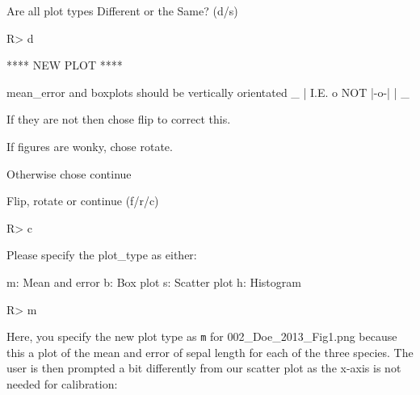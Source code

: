 \documentclass[12pt]{article}
\newcommand{\code}[1]{\texttt{#1}}
\begin{document}
\begin{CodeChunk}
\begin{CodeOutput}
Are all plot types Different or the Same? (d/s)
\end{CodeOutput}
\begin{CodeInput}
R> d
\end{CodeInput}
\begin{CodeOutput}
**** NEW PLOT ****

mean_error and boxplots should be vertically orientated
       _ 
       |  
  I.E. o    NOT  |-o-|
       |
       _

If they are not then chose flip to correct this.

If figures are wonky, chose rotate.

Otherwise chose continue

Flip, rotate or continue (f/r/c) 
\end{CodeOutput}
\begin{CodeInput}
R> c
\end{CodeInput}
\begin{CodeOutput}
Please specify the plot_type as either:

 m: Mean and error
 b: Box plot
 s: Scatter plot 
 h: Histogram
\end{CodeOutput}
\begin{CodeInput}
R> m
\end{CodeInput}
\end{CodeChunk}

Here, you specify the new plot type as \code{m} for 002\_Doe\_2013\_Fig1.png because this a plot of the mean and error of sepal length for each of the three species. The user is then prompted a bit differently from our scatter plot as the x-axis is not needed for calibration:
\end{document}
